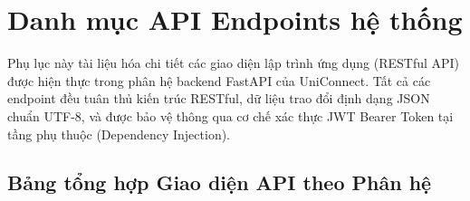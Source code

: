\chapter{Danh mục API Endpoints hệ thống}
\label{apd:C}

Phụ lục này tài liệu hóa chi tiết các giao diện lập trình ứng dụng (RESTful API) được hiện thực trong phân hệ backend FastAPI của UniConnect. Tất cả các endpoint đều tuân thủ kiến trúc RESTful, dữ liệu trao đổi định dạng JSON chuẩn UTF-8, và được bảo vệ thông qua cơ chế xác thực JWT Bearer Token tại tầng phụ thuộc (Dependency Injection).

\section{Bảng tổng hợp Giao diện API theo Phân hệ}

